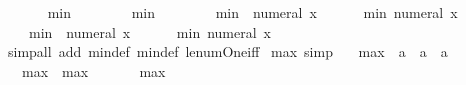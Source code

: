 \begin{isabellebody}
\ \ \isanewline
\ \ \ \ {\isachardoublequoteopen}min{\isacharprime}{\kern0pt}\ {}\ {}\ {\isacharequal}{\kern0pt}\ {}{\isachardoublequoteclose}\isanewline
\ \ \ \ {\isachardoublequoteopen}min{\isacharprime}{\kern0pt}\ {}\ {}\ {\isacharequal}{\kern0pt}\ {}{\isachardoublequoteclose}\isanewline
\ \ \ \ {\isachardoublequoteopen}min{\isacharprime}{\kern0pt}\ {}\ {\isacharparenleft}{\kern0pt}numeral\ x{\isacharparenright}{\kern0pt}\ {\isacharequal}{\kern0pt}\ {}{\isachardoublequoteclose}\isanewline
\ \ \ \ {\isachardoublequoteopen}min{\isacharprime}{\kern0pt}\ {\isacharparenleft}{\kern0pt}numeral\ x{\isacharparenright}{\kern0pt}\ {}\ {\isacharequal}{\kern0pt}\ {}{\isachardoublequoteclose}\isanewline
\ \ \ \ {\isachardoublequoteopen}min{\isacharprime}{\kern0pt}\ {}\ {\isacharparenleft}{\kern0pt}numeral\ x{\isacharparenright}{\kern0pt}\ {\isacharequal}{\kern0pt}\ {}{\isachardoublequoteclose}\isanewline
\ \ \ \ {\isachardoublequoteopen}min{\isacharprime}{\kern0pt}\ {\isacharparenleft}{\kern0pt}numeral\ x{\isacharparenright}{\kern0pt}\ {}\ {\isacharequal}{\kern0pt}\ {}{\isachardoublequoteclose}\isanewline
%
\isadelimproof
\ \ %
\endisadelimproof
%
\isatagproof
{}\isamarkupfalse%
\ {\isacharparenleft}{\kern0pt}simp{\isacharunderscore}{\kern0pt}all\ add{\isacharcolon}{\kern0pt}\ min{\isacharprime}{\kern0pt}{\isacharunderscore}{\kern0pt}def\ min{\isacharunderscore}{\kern0pt}def\ le{\isacharunderscore}{\kern0pt}num{\isacharunderscore}{\kern0pt}One{\isacharunderscore}{\kern0pt}iff{\isacharparenright}{\kern0pt}%
\endisatagproof
{\isafoldproof}%
%
\isadelimproof
\isanewline
%
\endisadelimproof
\isanewline
{}\isamarkupfalse%
\ max{\isacharunderscore}{\kern0pt}{}{\isacharunderscore}{\kern0pt}{}\ {\isacharbrackleft}{\kern0pt}simp{\isacharbrackright}{\kern0pt}{\isacharcolon}{\kern0pt}\isanewline
\ \ \ max{\isacharprime}{\kern0pt}\ {\isacharcolon}{\kern0pt}{\isacharcolon}{\kern0pt}\ {\isachardoublequoteopen}{\isacharprime}{\kern0pt}a\ {\isasymRightarrow}\ {\isacharprime}{\kern0pt}a\ {\isasymRightarrow}\ {\isacharprime}{\kern0pt}a{\isachardoublequoteclose}\isanewline
\ \ \ {\isachardoublequoteopen}max{\isacharprime}{\kern0pt}\ {\isasymequiv}\ max{\isachardoublequoteclose}\isanewline
\ \ \isanewline
\ \ \ \ {\isachardoublequoteopen}max{\isacharprime}{\kern0pt}\ {}\ {}\ {\isacharequal}{\kern0pt}\ {}{\isachardoublequoteclose}\isanewline

\end{isabellebody}
